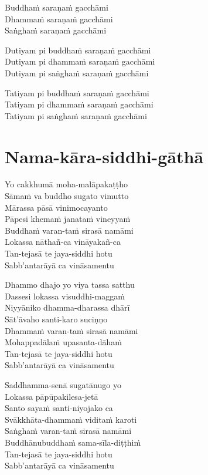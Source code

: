 
\begin{paritta}
Buddhaṁ saraṇaṁ gacchāmi\\
Dhammaṁ saraṇaṁ gacchāmi\\
Saṅghaṁ saraṇaṁ gacchāmi

Dutiyam pi buddhaṁ saraṇaṁ gacchāmi\\
Dutiyam pi dhammaṁ saraṇaṁ gacchāmi\\
Dutiyam pi saṅghaṁ saraṇaṁ gacchāmi

Tatiyam pi buddhaṁ saraṇaṁ gacchāmi\\
Tatiyam pi dhammaṁ saraṇaṁ gacchāmi\\
Tatiyam pi saṅghaṁ saraṇaṁ gacchāmi
\end{paritta}

\clearpage

\chapter{Nama-kāra-siddhi-gāthā}


\begin{paritta}
Yo cakkhumā moha-malāpakaṭṭho\\
Sāmaṁ va buddho sugato vimutto\\
Mārassa pāsā vinimocayanto\\
Pāpesi khemaṁ janataṁ vineyyaṁ\\
Buddhaṁ varan-taṁ sirasā namāmi\\
Lokassa nāthañ-ca vināyakañ-ca\\
Tan-tejasā te jaya-siddhi hotu\\
Sabb'antarāyā ca vināsamentu

Dhammo dhajo yo viya tassa satthu\\
Dassesi lokassa visuddhi-maggaṁ\\
Niyyāniko dhamma-dharassa dhārī\\
Sāt'āvaho santi-karo suciṇṇo\\
Dhammaṁ varan-taṁ sirasā namāmi\\
Mohappadālaṁ upasanta-dāhaṁ\\
Tan-tejasā te jaya-siddhi hotu\\
Sabb'antarāyā ca vināsamentu

Saddhamma-senā sugatānugo yo\\
Lokassa pāpūpakilesa-jetā\\
Santo sayaṁ santi-niyojako ca\\
Svākkhāta-dhammaṁ viditaṁ karoti\\
Saṅghaṁ varan-taṁ sirasā namāmi\\
Buddhānubuddhaṁ sama-sīla-diṭṭhiṁ\\
Tan-tejasā te jaya-siddhi hotu\\
Sabb'antarāyā ca vināsamentu
\end{paritta}

